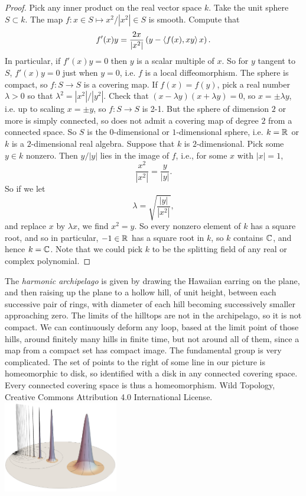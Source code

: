\begin{proof}
Pick any inner product on the real vector space \(k\).
Take the unit sphere \(S \subset k\).
The map \(f \colon x \in S \mapsto x^2/|x^2| \in S\) is smooth.
Compute that
\[
f'(x)y=\frac{2x}{|x^2|}\left(y-\left<f(x),xy\right>x\right).
\]
In particular, if \(f'(x)y=0\) then \(y\) is a scalar multiple of \(x\).
So for \(y\) tangent to \(S\), \(f'(x)y=0\) just when \(y=0\), i.e. \(f\) is a local diffeomorphism.
The sphere is compact, so \(f \colon S \to S\) is a covering map.
If \(f(x)=f(y)\), pick a real number \(\lambda > 0\) so that \(\lambda^2=|x^2|/|y^2|\).
Check that \((x-\lambda y)(x+\lambda y)=0\), so \(x=\pm \lambda y\), i.e. up to scaling \(x=\pm y\), so \(f \colon S \to S\) is 2-1.
But the sphere of dimension \(2\) or more is simply connected, so does not admit a covering map of degree \(2\) from a connected space.
So \(S\) is the \(0\)-dimensional or \(1\)-dimensional sphere, i.e. \(k=\mathbb{R}^{}\) or \(k\) is a \(2\)-dimensional real algebra.
Suppose that \(k\) is \(2\)-dimensional.
Pick some \(y \in k\) nonzero.
Then \(y/|y|\) lies in the image of \(f\), i.e., for some \(x\) with \(|x|=1\), 
\[
\frac{x^2}{|x^2|}=\frac{y}{|y|}.
\]
So if we let
\[
\lambda = \sqrt{\frac{|y|}{|x^2|}},
\]
and replace \(x\) by \(\lambda x\), we find \(x^2=y\).
So every nonzero element of \(k\) has a square root, and so in particular, \(-1 \in \mathbb{R}^{}\) has a square root in \(k\), so \(k\) contains \(\mathbb{C}^{}\), and hence \(k=\mathbb{C}^{}\).
Note that we could pick \(k\) to be the splitting field of any real or complex polynomial.
\end{proof}
\begin{exampleAndImage}{5cm}
The \emph{harmonic archipelago} is given by drawing the Hawaiian earring on the plane, and then raising up the plane to a hollow hill, of unit height, between each successive pair of rings, with diameter of each hill becoming successively smaller approaching zero.
The limits of the hilltops are not in the archipelago, so it is not compact.
We can continuously deform any loop, based at the limit point of those hills, around finitely many hills in finite time, but not around all of them, since a map from a compact set has compact image.
The fundamental group is very complicated.
The set of points to the right of some line in our picture is homeomorphic to disk, so identified with a disk in any connected covering space.
Every connected covering space is thus a homeomorphism.
Wild Topology, Creative Commons Attribution 4.0 International License.
\tcblower
\includegraphics[width=5cm]{ha}
\end{exampleAndImage}

